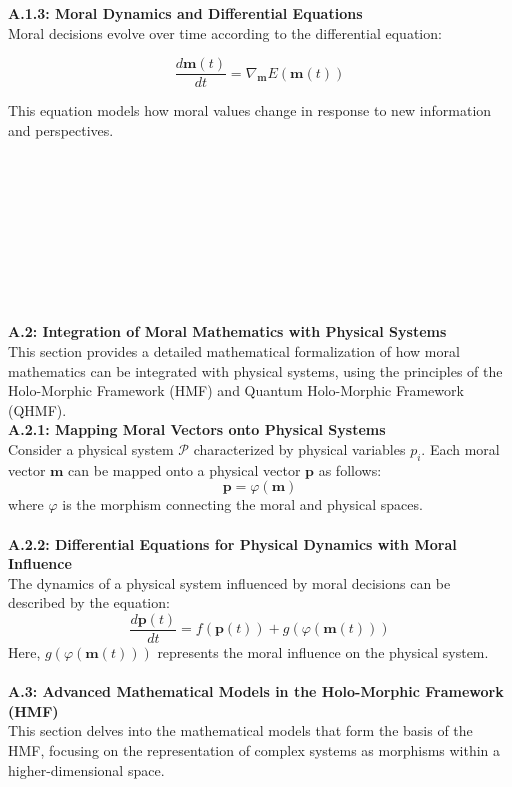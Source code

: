 \documentclass{article}
\begin{document}
\textbf{A.1.3: Moral Dynamics and Differential Equations}
\\

Moral decisions evolve over time according to the differential equation:

\[
\frac{d\mathbf{m}(t)}{dt} = \nabla_{\mathbf{m}} E(\mathbf{m}(t))
\]

 This equation models how moral values change in response to new information and perspectives.
\

\

\

\

\

\ 

\textbf{A.2: Integration of Moral Mathematics with Physical Systems}
\\

This section provides a detailed mathematical formalization of how moral mathematics can be integrated with physical systems, using the principles of the Holo-Morphic Framework (HMF) and Quantum Holo-Morphic Framework (QHMF).
\\

\textbf{A.2.1: Mapping Moral Vectors onto Physical Systems}
\\

Consider a physical system \( \mathcal{P} \) characterized by physical variables \( p_i \). Each moral vector \( \mathbf{m} \) can be mapped onto a physical vector \( \mathbf{p} \) as follows:
\[
\mathbf{p} = \varphi(\mathbf{m})
\]
where \( \varphi \) is the morphism connecting the moral and physical spaces.
\\
\\

\textbf{A.2.2: Differential Equations for Physical Dynamics with Moral Influence}
\\

The dynamics of a physical system influenced by moral decisions can be described by the equation:
\[
\frac{d\mathbf{p}(t)}{dt} = f(\mathbf{p}(t)) + g(\varphi(\mathbf{m}(t)))
\]
Here, \( g(\varphi(\mathbf{m}(t))) \) represents the moral influence on the physical system.
\\
\\

\textbf{A.3: Advanced Mathematical Models in the Holo-Morphic Framework (HMF)}
\\

This section delves into the mathematical models that form the basis of the HMF, focusing on the representation of complex systems as morphisms within a higher-dimensional space.
\\
\\
\end{document}
